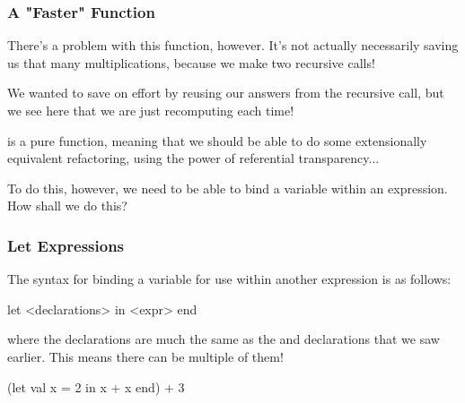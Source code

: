 \documentclass[aspectratio=169, handout]{beamer}
\begin{document}
\begin{frame}[fragile]
  \frametitle{A "Faster" Function}

  There's a problem with this function, however. It's not actually necessarily
  saving us that many multiplications, because we make two recursive calls!

  \vspace{\fill}

  We wanted to save on effort by reusing our answers from the recursive call,
  but we see here that we are just recomputing each time!

  \pause
  \vspace{\fill}

   is a pure function, meaning that we should be able to do some
  extensionally equivalent refactoring, using the power of referential
  transparency...

  \vspace{\fill}

  To do this, however, we need to be able to bind a variable within an
  expression. How shall we do this?
\end{frame}

\begin{frame}[fragile]
  \frametitle{Let Expressions}

  {\small
  The syntax for binding a variable for use within another expression is as follows:

  \pause
  \vspace{\fill}

  \begin{codeblock}
    let
      <declarations>
    in
      <expr>
    end
  \end{codeblock}

  where the declarations are much the same as the  and  declarations
  that we saw earlier. This means there can be multiple of them!

  \pause
  \vspace{\fill}

  \begin{codeblock}
    (let
      val x = 2
    in
      x + x
    end) + 3
  \end{codeblock}
  }
\end{frame}
\end{document}

